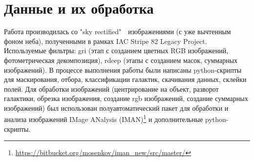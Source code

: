 \section{Данные и их обработка}
Работа производилась со "sky rectified"$\textrm{ }$ изображениями (с уже вычтенным фоном неба), полученными в рамках IAC Stripe 82 Legacy Project.  Используемые фильтры: gri (этап с созданием цветных RGB изображений, фотометрическая декомпозиция), rdeep (этапы с созданием масок, суммарных изображений). 
В процессе выполнения работы были написаны python-скрипты для маскирования, отбора, классификации галактик, скачивания данных, склейки полей.
Для обработки изображений (центрирование на объект, разворот галактики, обрезка изображения, создание rgb изображений, создание суммарных изображений) был использован полуавтоматический пакет для обработки и анализа изображений IMage ANalysis (IMAN)\footnote{\url{https://bitbucket.org/mosenkov/iman_new/src/master/}} и дополнительные python-скрипты. 

